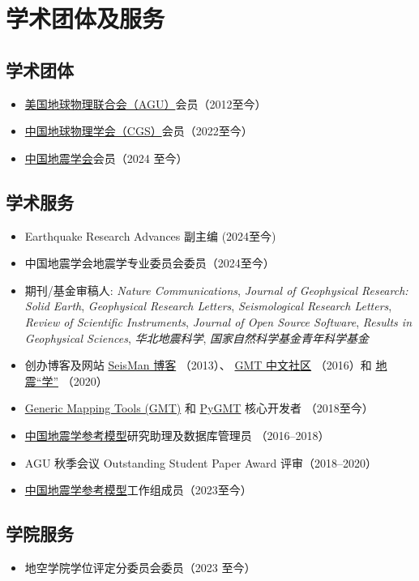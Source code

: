 \section{学术团体及服务}

\subsection{学术团体}
\begin{itemize}
\item \href{https://sites.agu.org/}{美国地球物理联合会（AGU）}会员（2012至今）
\item \href{http://www.cgscgs.org.cn/}{中国地球物理学会（CGS）}会员（2022至今）
\item \href{https://www.ssoc.org.cn/}{中国地震学会}会员（2024 至今）
\end{itemize}

\subsection{学术服务}
\begin{itemize}
\item Earthquake Research Advances 副主编 (2024至今)
\item 中国地震学会地震学专业委员会委员（2024至今）
\item 期刊/基金审稿人:
      \emph{Nature Communications},
      \emph{Journal of Geophysical Research: Solid Earth},
      \emph{Geophysical Research Letters},
      \emph{Seismological Research Letters},
      \emph{Review of Scientific Instruments},
      \emph{Journal of Open Source Software},
      \emph{Results in Geophysical Sciences},
      \emph{华北地震科学},
      \emph{国家自然科学基金青年科学基金}
\item 创办博客及网站
      \href{https://blog.seisman.info}{SeisMan 博客} （2013）、
      \href{http://gmt-china.org/}{GMT 中文社区} （2016）和
      \href{https://seismo-learn.org/}{地震``学''} （2020）
\item \href{https://github.com/GenericMappingTools/gmt}{Generic Mapping Tools (GMT)} 和
      \href{https://github.com/GenericMappingTools/pygmt}{PyGMT} 核心开发者 （2018至今）
\item \href{http://chinageorefmodel.org/}{中国地震学参考模型}研究助理及数据库管理员 （2016--2018）
\item AGU 秋季会议 Outstanding Student Paper Award 评审（2018--2020）
\item \href{http://chinageorefmodel.org/}{中国地震学参考模型}工作组成员（2023至今）
\end{itemize}

\subsection{学院服务}
\begin{itemize}
\item 地空学院学位评定分委员会委员（2023 至今）
\end{itemize}
